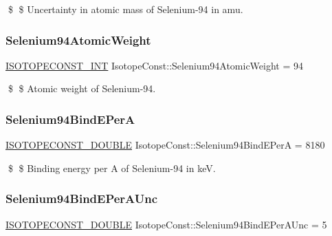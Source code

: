 \$ \$ Uncertainty in atomic mass of Selenium-\/94 in amu. \mbox{\label{group___isotope_const-_selenium-_se94_ga68c80d4005fba5473f3faf71f31d39aa}} 
\subsubsection{\texorpdfstring{Selenium94\+Atomic\+Weight}{Selenium94AtomicWeight}}
{\footnotesize\ttfamily \mbox{\hyperlink{group___isotope_const-_macros_ga5f18360b3e99483a35c32d789e62621c}{I\+S\+O\+T\+O\+P\+E\+C\+O\+N\+S\+T\+\_\+\+I\+NT}} Isotope\+Const\+::\+Selenium94\+Atomic\+Weight = 94}

\$ \$ Atomic weight of Selenium-\/94. \mbox{\label{group___isotope_const-_selenium-_se94_ga70766a6726b525ff73ea8028c8cd1bf9}} 
\subsubsection{\texorpdfstring{Selenium94\+Bind\+E\+PerA}{Selenium94BindEPerA}}
{\footnotesize\ttfamily \mbox{\hyperlink{group___isotope_const-_macros_ga8f45a7272ce02c0b4c65c44636ed719a}{I\+S\+O\+T\+O\+P\+E\+C\+O\+N\+S\+T\+\_\+\+D\+O\+U\+B\+LE}} Isotope\+Const\+::\+Selenium94\+Bind\+E\+PerA = 8180}

\$ \$ Binding energy per A of Selenium-\/94 in keV. \mbox{\label{group___isotope_const-_selenium-_se94_ga9f40fcd602cbd5f43685650e89e6d359}} 
\subsubsection{\texorpdfstring{Selenium94\+Bind\+E\+Per\+A\+Unc}{Selenium94BindEPerAUnc}}
{\footnotesize\ttfamily \mbox{\hyperlink{group___isotope_const-_macros_ga8f45a7272ce02c0b4c65c44636ed719a}{I\+S\+O\+T\+O\+P\+E\+C\+O\+N\+S\+T\+\_\+\+D\+O\+U\+B\+LE}} Isotope\+Const\+::\+Selenium94\+Bind\+E\+Per\+A\+Unc = 5}

